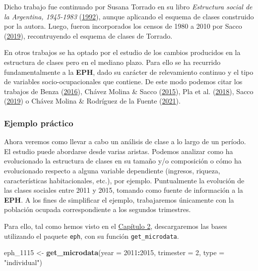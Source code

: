 \documentclass[
]{article}
\newenvironment{Shaded}{\begin{snugshade}}{\end{snugshade}}
\newcommand{\AttributeTok}[1]{\textcolor[rgb]{0.13,0.29,0.53}{#1}}
\newcommand{\DecValTok}[1]{\textcolor[rgb]{0.00,0.00,0.81}{#1}}
\newcommand{\FunctionTok}[1]{\textcolor[rgb]{0.13,0.29,0.53}{\textbf{#1}}}
\newcommand{\NormalTok}[1]{#1}
\newcommand{\OtherTok}[1]{\textcolor[rgb]{0.56,0.35,0.01}{#1}}
\newcommand{\SpecialCharTok}[1]{\textcolor[rgb]{0.81,0.36,0.00}{\textbf{#1}}}
\newcommand{\StringTok}[1]{\textcolor[rgb]{0.31,0.60,0.02}{#1}}
\begin{document}
Dicho trabajo fue continuado por Susana Torrado en su libro \emph{Estructura social de la Argentina, 1945-1983} (\protect\hyperlink{ref-Torrado1992}{1992}), aunque aplicando el esquema de clases construido por la autora. Luego, fueron incorporados los censos de 1980 a 2010 por Sacco (\protect\hyperlink{ref-Sacco2019}{2019}), recontruyendo el esquema de clases de Torrado.

En otros trabajos se ha optado por el estudio de los cambios producidos en la estructura de clases pero en el mediano plazo. Para ello se ha recurrido fundamentalmente a la \textbf{EPH}, dado su carácter de relevamiento continuo y el tipo de variables socio-ocupacionales que contiene. De este modo podemos citar los trabajos de Benza (\protect\hyperlink{ref-Benza2016}{2016}), Chávez Molina \& Sacco (\protect\hyperlink{ref-ChavezMolina2015}{2015}), Pla et al. (\protect\hyperlink{ref-Pla.etal2018}{2018}), Sacco (\protect\hyperlink{ref-Sacco2019}{2019}) o Chávez Molina \& Rodríguez de la Fuente (\protect\hyperlink{ref-ChavezMolina.RodriguezdelaFuente2021}{2021}).

\hypertarget{ejemplo-pruxe1ctico}{%
\subsubsection{Ejemplo práctico}\label{ejemplo-pruxe1ctico}}

Ahora veremos como llevar a cabo un análisis de clase a lo largo de un período. El estudio puede abordarse desde varias aristas. Podemos analizar como ha evolucionado la estructura de clases en su tamaño y/o composición o cómo ha evolucionado respecto a alguna variable dependiente (ingresos, riqueza, características habitacionales, etc.), por ejemplo. Puntualmente la evolución de las clases sociales entre 2011 y 2015, tomando como fuente de información a la \textbf{EPH}. A los fines de simplificar el ejemplo, trabajaremos únicamente con la población ocupada correspondiente a los segundos trimestres.

Para ello, tal como hemos visto en el \protect\hyperlink{fuentes}{Capítulo 2}, descargaremos las bases utilizando el paquete \texttt{eph}, con su función \texttt{get\_microdata}.

\begin{Shaded}
\begin{Highlighting}[]
\NormalTok{eph\_1115 }\OtherTok{\textless{}{-}} \FunctionTok{get\_microdata}\NormalTok{(}\AttributeTok{year =} \DecValTok{2011}\SpecialCharTok{:}\DecValTok{2015}\NormalTok{, }\AttributeTok{trimester =} \DecValTok{2}\NormalTok{, }\AttributeTok{type =} \StringTok{"individual"}\NormalTok{)}
\end{Highlighting}
\end{Shaded}
\end{document}
